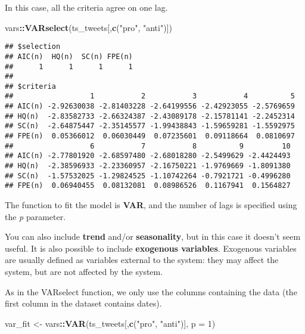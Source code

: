 \documentclass[
]{article}
\newenvironment{Shaded}{\begin{snugshade}}{\end{snugshade}}
\newcommand{\AttributeTok}[1]{\textcolor[rgb]{0.13,0.29,0.53}{#1}}
\newcommand{\DecValTok}[1]{\textcolor[rgb]{0.00,0.00,0.81}{#1}}
\newcommand{\FunctionTok}[1]{\textcolor[rgb]{0.13,0.29,0.53}{\textbf{#1}}}
\newcommand{\NormalTok}[1]{#1}
\newcommand{\OtherTok}[1]{\textcolor[rgb]{0.56,0.35,0.01}{#1}}
\newcommand{\SpecialCharTok}[1]{\textcolor[rgb]{0.81,0.36,0.00}{\textbf{#1}}}
\newcommand{\StringTok}[1]{\textcolor[rgb]{0.31,0.60,0.02}{#1}}
\begin{document}
In this case, all the criteria agree on one lag.

\begin{Shaded}
\begin{Highlighting}[]
\NormalTok{vars}\SpecialCharTok{::}\FunctionTok{VARselect}\NormalTok{(ts\_tweets[,}\FunctionTok{c}\NormalTok{(}\StringTok{"pro"}\NormalTok{, }\StringTok{"anti"}\NormalTok{)])}
\end{Highlighting}
\end{Shaded}

\begin{verbatim}
## $selection
## AIC(n)  HQ(n)  SC(n) FPE(n) 
##      1      1      1      1 
## 
## $criteria
##                  1           2           3           4          5
## AIC(n) -2.92630038 -2.81403228 -2.64199556 -2.42923055 -2.5769659
## HQ(n)  -2.83582733 -2.66324387 -2.43089178 -2.15781141 -2.2452314
## SC(n)  -2.64875447 -2.35145577 -1.99438843 -1.59659281 -1.5592975
## FPE(n)  0.05366012  0.06030449  0.07235601  0.09118664  0.0810697
##                  6           7           8          9         10
## AIC(n) -2.77801920 -2.68597480 -2.68018280 -2.5499629 -2.4424493
## HQ(n)  -2.38596933 -2.23360957 -2.16750221 -1.9769669 -1.8091380
## SC(n)  -1.57532025 -1.29824525 -1.10742264 -0.7921721 -0.4996280
## FPE(n)  0.06940455  0.08132081  0.08986526  0.1167941  0.1564827
\end{verbatim}

The function to fit the model is \textbf{VAR}, and the number of lags is specified using the \emph{p} parameter.

You can also include \textbf{trend} and/or \textbf{seasonality}, but in this case it doesn't seem useful. It is also possible to include \textbf{exogenous variables}. Exogenous variables are usually defined as variables external to the system: they may affect the system, but are not affected by the system.

As in the VARselect function, we only use the columns containing the data (the first column in the dataset contains dates).

\begin{Shaded}
\begin{Highlighting}[]
\NormalTok{var\_fit }\OtherTok{\textless{}{-}}\NormalTok{ vars}\SpecialCharTok{::}\FunctionTok{VAR}\NormalTok{(ts\_tweets[,}\FunctionTok{c}\NormalTok{(}\StringTok{"pro"}\NormalTok{, }\StringTok{"anti"}\NormalTok{)], }\AttributeTok{p =} \DecValTok{1}\NormalTok{)}
\end{Highlighting}
\end{Shaded}
\end{document}
